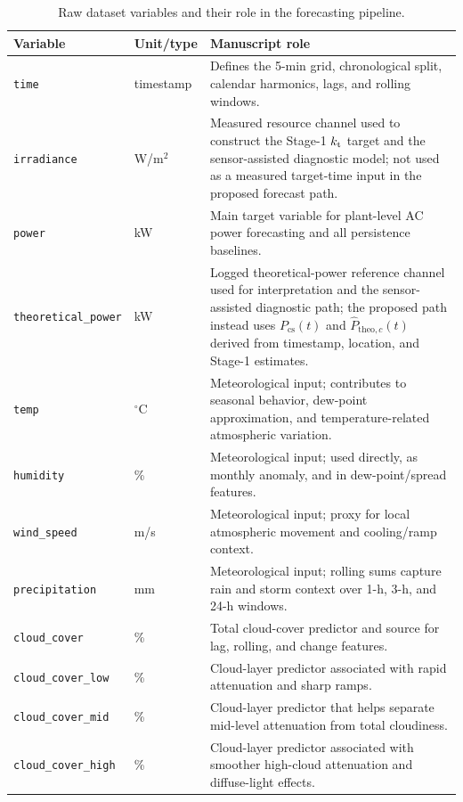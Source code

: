 \begin{table}[!t]
\caption{Raw dataset variables and their role in the forecasting pipeline.}
\label{tab:raw_variable_roles}
\centering
\small
\begin{tabularx}{\textwidth}{@{}l l >{\raggedright\arraybackslash}X@{}}
\toprule
Variable & Unit/type & Manuscript role \\
\midrule
\texttt{time} & timestamp & Defines the 5-min grid, chronological split, calendar harmonics, lags, and rolling windows. \\
\texttt{irradiance} & W/m$^2$ & Measured resource channel used to construct the Stage-1 $k_{\mathrm{t}}$ target and the sensor-assisted diagnostic model; not used as a measured target-time input in the proposed forecast path. \\
\texttt{power} & kW & Main target variable for plant-level AC power forecasting and all persistence baselines. \\
\texttt{theoretical\_power} & kW & Logged theoretical-power reference channel used for interpretation and the sensor-assisted diagnostic path; the proposed path instead uses $P_{\mathrm{cs}}(t)$ and $\widehat{P}_{\mathrm{theo},c}(t)$ derived from timestamp, location, and Stage-1 estimates. \\
\texttt{temp} & $^\circ$C & Meteorological input; contributes to seasonal behavior, dew-point approximation, and temperature-related atmospheric variation. \\
\texttt{humidity} & \% & Meteorological input; used directly, as monthly anomaly, and in dew-point/spread features. \\
\texttt{wind\_speed} & m/s & Meteorological input; proxy for local atmospheric movement and cooling/ramp context. \\
\texttt{precipitation} & mm & Meteorological input; rolling sums capture rain and storm context over 1-h, 3-h, and 24-h windows. \\
\texttt{cloud\_cover} & \% & Total cloud-cover predictor and source for lag, rolling, and change features. \\
\texttt{cloud\_cover\_low} & \% & Cloud-layer predictor associated with rapid attenuation and sharp ramps. \\
\texttt{cloud\_cover\_mid} & \% & Cloud-layer predictor that helps separate mid-level attenuation from total cloudiness. \\
\texttt{cloud\_cover\_high} & \% & Cloud-layer predictor associated with smoother high-cloud attenuation and diffuse-light effects. \\
\bottomrule
\end{tabularx}
\end{table}
